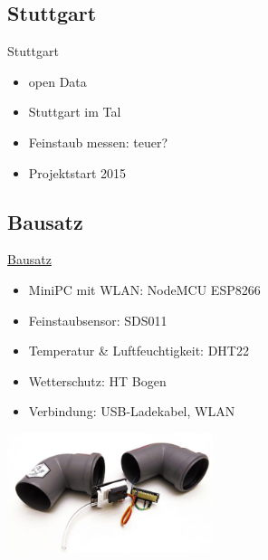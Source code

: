 \documentclass[aspectratio=169]{beamer} %
\begin{document}
\subsection{Stuttgart}
\begin{frame}{Stuttgart}
  \begin{itemize}
  \item open Data
  \item Stuttgart im Tal
  \item Feinstaub messen: teuer?
  \item Projektstart 2015
  \end{itemize}
\end{frame}

\subsection{Bausatz}
\begin{frame}{\href{http://luftdaten.info/feinstaubsensor-bauen/}{Bausatz}}
  \begin{itemize}
  \item MiniPC mit WLAN: NodeMCU ESP8266
  \item Feinstaubsensor: SDS011
  \item Temperatur & Luftfeuchtigkeit: DHT22 
  \item Wetterschutz: HT Bogen
  \item Verbindung: USB-Ladekabel, WLAN
  \end{itemize}
  \begin{center}
    \includegraphics[width=6cm]{../screenshots/Feinstaub-Sensor-Bausatz-e1479558693357.jpg}
  \end{center}
\end{frame}
\end{document}
